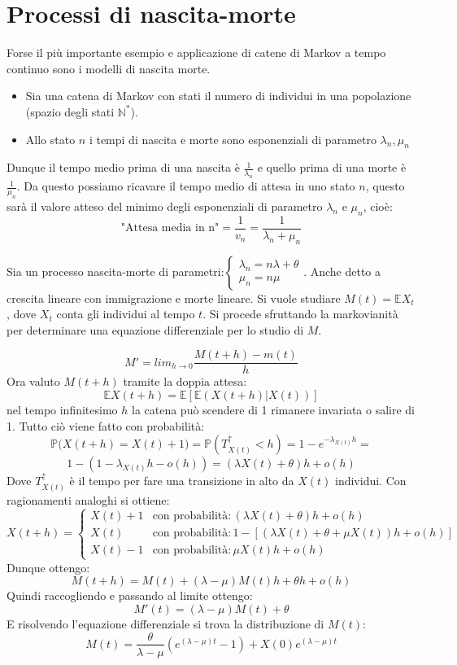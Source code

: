 \section{Processi di nascita-morte}
Forse il più importante esempio e applicazione di catene di Markov a tempo continuo sono i modelli di nascita morte.
\begin{itemize}
    \item Sia una catena di Markov con stati il numero di individui in una popolazione (spazio degli stati $\mathbb{N}^*$).
    \item Allo stato $n$ i tempi di nascita e morte sono esponenziali di parametro $\lambda_n,\mu_n$
\end{itemize}
Dunque il tempo medio prima di una nascita è $\frac{1}{\lambda_n}$ e quello prima di una morte è $\frac{1}{\mu_n}$. Da questo possiamo ricavare il tempo medio di attesa in uno stato $n$, questo sarà il valore atteso del minimo degli esponenziali di parametro $\lambda_n$ e $\mu_n$, cioè:
\[\text{"Attesa media in n"}=\frac{1}{v_n}=\frac{1}{\lambda_n+\mu_n}\]

\begin{example}
Sia un processo nascita-morte di parametri:$\begin{cases}
\lambda_n=n\lambda+\theta \\
\mu_n=n\mu
\end{cases}$.
Anche detto a crescita lineare con immigrazione e morte lineare.
\newline
Si vuole studiare $M(t)=\mathbb{E}X_t$, dove $X_t$ conta gli individui al tempo $t$. Si procede sfruttando la markovianità per determinare una equazione differenziale per lo studio di $M$.

\[M'=lim_{h\to0}\frac{M(t+h)-m(t)}{h}\]
Ora valuto $M(t+h)$ tramite la doppia attesa:
\[\mathbb{E}X(t+h)=\mathbb{E}[\mathbb{E}(X(t+h)|X(t))]\]
nel tempo infinitesimo $h$ la catena può scendere di 1 rimanere invariata o salire di 1. Tutto ciò viene fatto con probabilità:
\[\mathbb{P}\Big(X(t+h)=X(t)+1\Big)=\mathbb{P}(T_{X(t)}^{\uparrow}<h)=1-e^{-\lambda_{X(t)}h}=\]
\[1-(1-\lambda_{X(t)}h-o(h))=(\lambda X(t)+\theta)h+o(h)\]
Dove $T_{X(t)}^{\uparrow}$ è il tempo per fare una transizione in alto da $X(t)$ individui. Con ragionamenti analoghi si ottiene:
\[X(t+h)=\begin{cases}
X(t)+1 & \text{con probabilità}: (\lambda X(t)+\theta)h+o(h) \\
X(t) & \text{con probabilità}: 1-[(\lambda X(t)+\theta+\mu X(t))h + o(h)] \\
X(t)-1 & \text{con probabilità}: \mu X(t)h + o(h)
\end{cases}\]
Dunque ottengo:
\[M(t+h)=M(t)+(\lambda-\mu)M(t)h+\theta h+o(h)\]
Quindi raccogliendo e passando al limite ottengo:
\[M'(t)=(\lambda-\mu)M(t)+\theta\]
E risolvendo l'equazione differenziale si trova la distribuzione di $M(t)$:
\[M(t)=\frac{\theta}{\lambda-\mu}(e^{(\lambda-\mu)t}-1)+X(0)e^{(\lambda-\mu)t}\]
\end{example}


